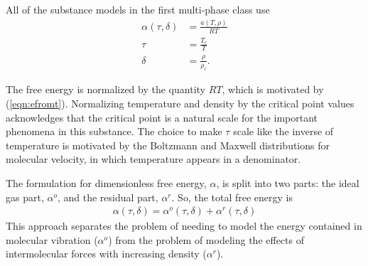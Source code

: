 All of the substance models in the first multi-phase class use
\begin{subequations}
\begin{align}
\alpha(\tau,\delta) &= \frac{a(T,\rho)}{R T}\\
\tau &= \frac{T_c}{T}\\
\delta &= \frac{\rho}{\rho_c}.
\end{align}
\end{subequations}

The free energy is normalized by the quantity $R T$, which is motivated by (\ref{eqn:efromt}).  Normalizing temperature and density by the critical point values acknowledges that the critical point is a natural scale for the important phenomena in this substance.  The choice to make $\tau$ scale like the inverse of temperature is motivated by the Boltzmann and Maxwell distributions for molecular velocity, in which temperature appears in a denominator.

The formulation for dimensionless free energy, $\alpha$, is split into two parts: the ideal gas part, $\alpha^o$, and the residual part, $\alpha^r$.  So, the total free energy is
\begin{align}
\alpha(\tau, \delta) = \alpha^o(\tau, \delta) + \alpha^r(\tau, \delta)
\end{align}
This approach separates the problem of needing to model the energy contained in molecular vibration ($\alpha^o$) from the problem of modeling the effects of intermolecular forces with increasing density ($\alpha^r$).

